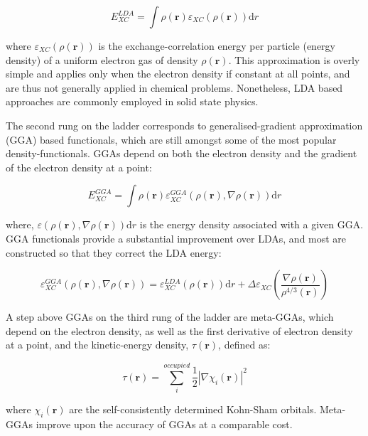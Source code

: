 \begin{equation}
  E_{XC}^{LDA} = \int \rho (\mathbf{r}) \varepsilon_{XC} (\rho(\mathbf{r})) \mathrm{d}r
\end{equation}

\noindent where $\varepsilon_{XC}(\rho(\mathbf{r}))$ is the exchange-correlation energy per particle (energy density) of a uniform electron gas of density $\rho(\mathbf{r})$. This approximation is overly simple and applies only when the electron density if constant at all points, and are thus not generally applied in chemical problems. Nonetheless, LDA based approaches are commonly employed in solid state physics.

The second rung on the ladder corresponds to generalised-gradient approximation (GGA) based functionals, which are still amongst some of the most popular density-functionals. GGAs depend on both the electron density and the gradient of the electron density at a point:

\begin{equation}
  E_{XC}^{GGA} = \int \rho(\mathbf{r}) \varepsilon_{XC}^{GGA}(\rho(\mathbf{r}), \nabla \rho(\mathbf{r})) \mathrm{d}r
\end{equation}

\noindent where, $\varepsilon(\rho(\mathbf{r}), \nabla \rho(\mathbf{r})) \mathrm{d}r$ is the energy density associated with a given GGA. GGA functionals provide a substantial improvement over LDAs, and most are constructed so that they correct the LDA energy:

\begin{equation}
  \varepsilon_{XC}^{GGA}(\rho(\mathbf{r}), \nabla \rho(\mathbf{r})) = \varepsilon_{XC}^{LDA}(\rho(\mathbf{r})) \mathrm{d}r + \Delta \varepsilon_{XC}\left( \frac{\nabla \rho(\mathbf{r})}{\rho^{4/3}({\mathbf{r}})}\right)
\end{equation}

A step above GGAs on the third rung of the ladder are meta-GGAs, which depend on the electron density, as well as the first derivative of electron density at a point, and the kinetic-energy density, $\tau(\mathbf{r})$, defined as:

\begin{equation}
  \tau(\mathbf{r}) = \sum_i^{occupied} \frac{1}{2}|\nabla \chi_i(\mathbf{r})|^2
\end{equation}

\noindent where $\chi_i(\mathbf{r})$ are the self-consistently determined Kohn-Sham orbitals. Meta-GGAs improve upon the accuracy of GGAs at a comparable cost.\cite{Cramer2004}

